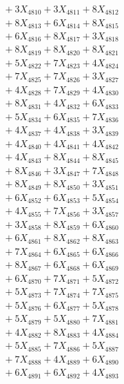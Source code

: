 \documentclass[a4paper,10pt]{article}
\begin{document}
{\begin{align}
&\;  + 3 X_{4810} + 3 X_{4811} + 8 X_{4812} \\[0.3ex]
&\;  + 8 X_{4813} + 6 X_{4814} + 8 X_{4815} \\[0.3ex]
&\;  + 6 X_{4816} + 8 X_{4817} + 3 X_{4818} \\[0.3ex]
&\;  + 8 X_{4819} + 8 X_{4820} + 8 X_{4821} \\[0.3ex]
&\;  + 5 X_{4822} + 7 X_{4823} + 4 X_{4824} \\[0.3ex]
&\;  + 7 X_{4825} + 7 X_{4826} + 3 X_{4827} \\[0.3ex]
&\;  + 4 X_{4828} + 7 X_{4829} + 4 X_{4830} \\[0.3ex]
&\;  + 8 X_{4831} + 4 X_{4832} + 6 X_{4833} \\[0.3ex]
&\;  + 5 X_{4834} + 6 X_{4835} + 7 X_{4836} \\[0.3ex]
&\;  + 4 X_{4837} + 4 X_{4838} + 3 X_{4839} \\[0.5ex]\allowbreak
&\;  + 4 X_{4840} + 4 X_{4841} + 4 X_{4842} \\[0.3ex]
&\;  + 4 X_{4843} + 8 X_{4844} + 8 X_{4845} \\[0.3ex]
&\;  + 8 X_{4846} + 3 X_{4847} + 7 X_{4848} \\[0.3ex]
&\;  + 8 X_{4849} + 8 X_{4850} + 3 X_{4851} \\[0.3ex]
&\;  + 6 X_{4852} + 6 X_{4853} + 5 X_{4854} \\[0.3ex]
&\;  + 4 X_{4855} + 7 X_{4856} + 3 X_{4857} \\[0.3ex]
&\;  + 3 X_{4858} + 8 X_{4859} + 6 X_{4860} \\[0.3ex]
&\;  + 6 X_{4861} + 8 X_{4862} + 8 X_{4863} \\[0.3ex]
&\;  + 7 X_{4864} + 6 X_{4865} + 6 X_{4866} \\[0.3ex]
&\;  + 8 X_{4867} + 6 X_{4868} + 6 X_{4869} \\[0.5ex]\allowbreak
&\;  + 6 X_{4870} + 7 X_{4871} + 5 X_{4872} \\[0.3ex]
&\;  + 5 X_{4873} + 7 X_{4874} + 7 X_{4875} \\[0.3ex]
&\;  + 5 X_{4876} + 6 X_{4877} + 5 X_{4878} \\[0.3ex]
&\;  + 5 X_{4879} + 5 X_{4880} + 7 X_{4881} \\[0.3ex]
&\;  + 4 X_{4882} + 8 X_{4883} + 4 X_{4884} \\[0.3ex]
&\;  + 5 X_{4885} + 7 X_{4886} + 5 X_{4887} \\[0.3ex]
&\;  + 7 X_{4888} + 4 X_{4889} + 6 X_{4890} \\[0.3ex]
&\;  + 6 X_{4891} + 6 X_{4892} + 4 X_{4893} \\[0.3ex]

\end{align}}
\end{document}
